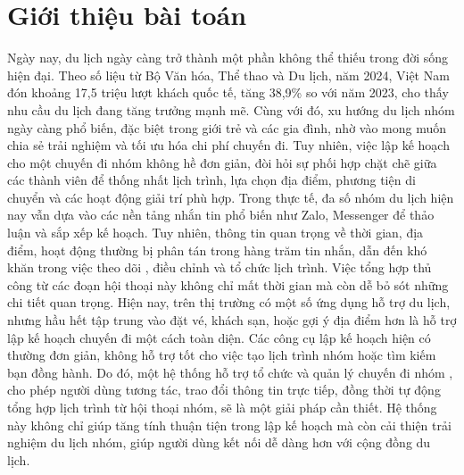 \section{Giới thiệu bài toán}

Ngày nay, du lịch ngày càng trở thành một phần không thể thiếu trong đời sống hiện đại.
Theo số liệu từ Bộ Văn hóa, Thể thao và Du lịch, năm 2024, Việt Nam đón khoảng 17,5 triệu lượt khách quốc tế, tăng 38,9\% so với năm 2023\cite{bvhttdl2024}, cho thấy nhu cầu du lịch đang tăng
trưởng mạnh mẽ. Cùng với đó, xu hướng du lịch nhóm ngày càng phổ biến, đặc biệt trong giới trẻ và các gia đình, nhờ vào mong muốn chia sẻ trải nghiệm và tối ưu hóa chi phí chuyến đi.\nl
\indent Tuy nhiên, việc lập kế hoạch cho một chuyến đi nhóm không hề đơn giản, đòi hỏi sự phối hợp chặt chẽ giữa các thành viên để thống nhất lịch trình, lựa chọn địa điểm, 
phương tiện di chuyển và các hoạt động giải trí phù hợp. 
Trong thực tế, đa số nhóm du lịch hiện nay vẫn 
dựa vào các nền tảng nhắn tin phổ biến như Zalo, Messenger 
để thảo luận và sắp xếp kế hoạch. Tuy nhiên, 
thông tin quan trọng về 
thời gian, địa điểm, hoạt động thường bị phân tán trong 
hàng trăm tin nhắn, dẫn đến khó khăn trong việc theo dõi
, điều chỉnh và tổ chức lịch trình. Việc tổng hợp thủ công từ
 các đoạn hội thoại này không chỉ mất thời gian mà còn
  dễ bỏ sót những chi tiết quan trọng. \nl
\indent Hiện nay, trên thị trường có một số ứng dụng hỗ trợ du lịch, nhưng hầu hết tập trung vào đặt vé, khách sạn, hoặc gợi ý địa điểm hơn là hỗ trợ lập kế hoạch chuyến đi một cách toàn diện. Các công cụ lập kế hoạch hiện có thường đơn giản, không hỗ trợ tốt cho việc tạo lịch trình nhóm hoặc tìm kiếm bạn đồng hành. Do đó, một hệ thống hỗ trợ tổ chức và quản lý chuyến đi nhóm
, cho phép người dùng tương tác, trao đổi thông tin trực tiếp, 
đồng thời tự động tổng hợp lịch trình từ hội thoại nhóm,
 sẽ là một giải pháp cần thiết. Hệ thống này không chỉ giúp 
 tăng tính thuận tiện trong lập kế hoạch mà còn 
 cải thiện trải nghiệm du lịch nhóm, 
 giúp người dùng kết nối dễ dàng hơn với cộng đồng du lịch.\nl
